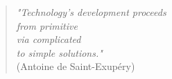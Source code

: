
%
%
%

\begin{dedication}
\begin{verse}
  \begin{flushright}
    \textit{"Technology's development proceeds\\
      from primitive\\
      via complicated\\
      to simple solutions."}\\

    (Antoine de Saint-Exup\'{e}ry)
  \end{flushright}
\end{verse}
\end{dedication}




